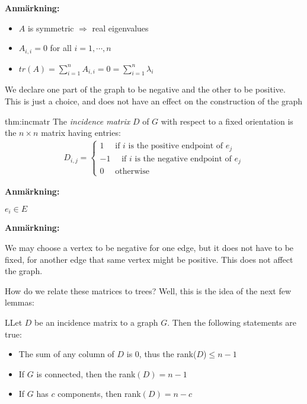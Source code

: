 \par\bigskip
\noindent\textbf{Anmärkning:}\par
\begin{itemize}
  \item $A$ is symmetric $\Rightarrow$ real eigenvalues
  \item $A_{i,i} = 0$ for all $i=1,\cdots,n$
  \item $tr(A) = \sum_{i=1}^{n}A_{i,i} = 0 = \sum_{i=1}^{n}\lambda_i$
\end{itemize}
\par\bigskip
\noindent We declare one part of the graph to be negative and the other to be positive. This is just a choice, and does not have an effect on the construction of the graph
\par\bigskip
\begin{theo}{thm:incmatr}
  The \textit{incidence matrix} $D$ of $G$ with respect to a fixed orientation is the $n\times n$ matrix having entries:
  \begin{equation*}
    \begin{gathered}
      D_{i,j} = \begin{cases}1\quad \text{ if $i$ is the positive endpoint of $e_j$}\\-1\quad\text{ if $i$ is the negative endpoint of $e_j$}\\0\quad \text{ otherwise}\end{cases}
    \end{gathered}
  \end{equation*}
  \par\bigskip
  \noindent\textbf{Anmärkning:}\par
  \noindent $e_i\in E$
  \par\bigskip
  \noindent\textbf{Anmärkning:}\par
  \noindent We may choose a vertex to be negative for one edge, but it does not have to be fixed, for another edge that same vertex might be positive. This does not affect the graph. 
\end{theo}
\newpage
\noindent How do we relate these matrices to trees? Well, this is the idea of the next few lemmas:
\par\bigskip
\begin{lem}
  LLet $D$ be an incidence matrix to a graph $G$. Then the following statements are true:\par
  \begin{itemize}
    \item The sum of any column of $D$ is 0, thus the rank($D$)$\leq n-1$\par
    \item If $G$ is connected, then the rank$(D) = n-1$
    \item If $G$ has $c$ components, then rank$(D) = n-c$
  \end{itemize}
\end{lem}
